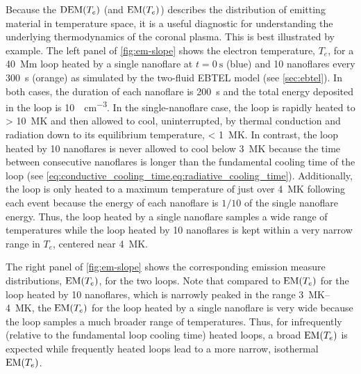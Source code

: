Because the $\textup{DEM}(T_e)$ (and $\textup{EM}(T_e)$) describes the distribution of emitting material in temperature space, it is a useful diagnostic for understanding the underlying thermodynamics of the coronal plasma. This is best illustrated by example. The left panel of \autoref{fig:em-slope} shows the electron temperature, $T_e$, for a \SI{40}{\mega\m} loop heated by a single nanoflare at $t=\SI{0}{\second}$ (blue) and 10 nanoflares every \SI{300}{\second} (orange) as simulated by the two-fluid EBTEL model (see \autoref{sec:ebtel}). In both cases, the duration of each nanoflare is \SI{200}{\second} and the total energy deposited in the loop is \SI{10}{\erg\per\cubic\cm}. In the single-nanoflare case, the loop is rapidly heated to \SI{> 10}{\mega\kelvin} and then allowed to cool, uninterrupted, by thermal conduction and radiation down to its equilibrium temperature, \SI{< 1}{\mega\kelvin}. In contrast, the loop heated by 10 nanoflares is never allowed to cool below \SI{3}{\mega\kelvin} because the time between consecutive nanoflares is longer than the fundamental cooling time of the loop (see \cref{eq:conductive_cooling_time,eq:radiative_cooling_time}). Additionally, the loop is only heated to a maximum temperature of just over \SI{4}{\mega\kelvin} following each event because the energy of each nanoflare is $1/10$ of the single nanoflare energy. Thus, the loop heated by a single nanoflare samples a wide range of temperatures while the loop heated by 10 nanoflares is kept within a very narrow range in $T_e$, centered near \SI{4}{\mega\kelvin}.

The right panel of \autoref{fig:em-slope} shows the corresponding emission measure distributions, $\textup{EM}(T_e)$, for the two loops. Note that compared to $\textup{EM}(T_e)$ for the loop heated by 10 nanoflares, which is narrowly peaked in the range \SIrange{3}{4}{\mega\kelvin}, the $\textup{EM}(T_e)$ for the loop heated by a single nanoflare is very wide because the loop samples a much broader range of temperatures. Thus, for infrequently (relative to the fundamental loop cooling time) heated loops, a broad $\textup{EM}(T_e)$ is expected while frequently heated loops lead to a more narrow, isothermal $\textup{EM}(T_e)$.


